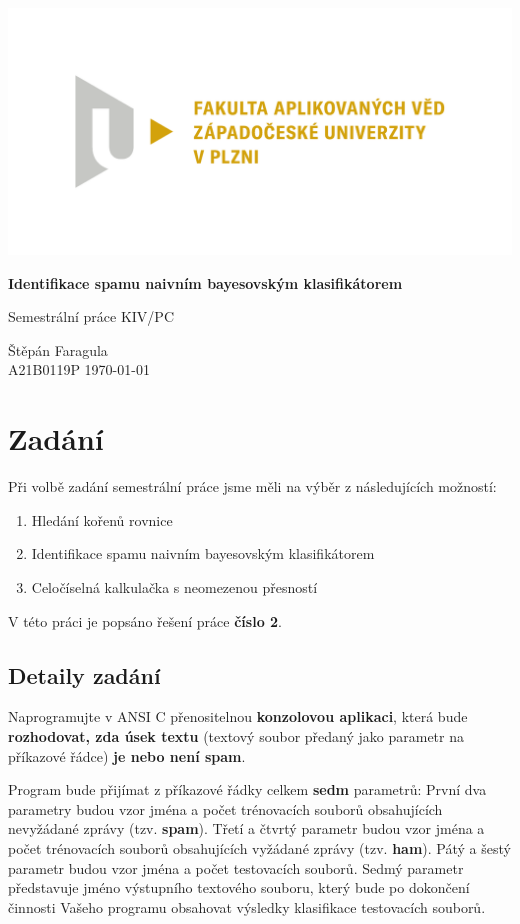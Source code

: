 \documentclass[12pt]{report}
\begin{document}
	
	\begin{titlepage}
		\centering
		\Large
		
		\includegraphics[width=.7\textwidth]{fav}
		
		\vspace{15mm}
		{\Huge\bfseries Identifikace spamu naivním bayesovským klasifikátorem}
		
		\vspace{15mm}
		{\LARGE Semestrální práce KIV/PC}
		
		\vfill
		\raggedright
		Štěpán Faragula\\
		A21B0119P
		\hfill 
		\today
	\end{titlepage}
	
	\tableofcontents

	\chapter{Zadání}
	Při volbě zadání semestrální práce jsme měli na výběr z následujících možností:
		
	\begin{enumerate}
		\item Hledání kořenů rovnice
		\item Identifikace spamu naivním bayesovským klasifikátorem
		\item Celočíselná kalkulačka s neomezenou přesností
	\end{enumerate}
		
	V této práci je popsáno řešení práce \textbf{číslo 2}.
	
	\section{Detaily zadání}
	Naprogramujte v ANSI C přenositelnou \textbf{konzolovou aplikaci}, která bude \textbf{rozhodovat, zda úsek textu} (textový soubor předaný jako parametr na příkazové řádce) \textbf{je nebo není spam}.
	
	Program bude přijímat z příkazové řádky celkem \textbf{sedm} parametrů: První dva parametry budou vzor jména a počet trénovacích souborů obsahujících nevyžádané zprávy (tzv. \textbf{spam}). Třetí a čtvrtý parametr budou vzor jména a počet trénovacích souborů obsahujících vyžádané zprávy (tzv. \textbf{ham}). Pátý a šestý parametr budou vzor jména a počet testovacích souborů. Sedmý parametr představuje jméno výstupního textového souboru, který bude po dokončení činnosti Vašeho	programu obsahovat výsledky klasifikace testovacích souborů.
	
\end{document}
